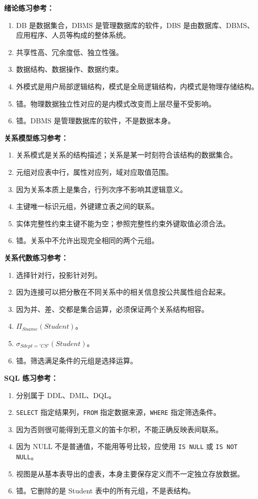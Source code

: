 \documentclass{../../note}
\begin{document}
\textbf{绪论练习参考：}

\begin{enumerate}
  \item DB 是数据集合，DBMS 是管理数据库的软件，DBS 是由数据库、DBMS、应用程序、人员等构成的整体系统。
  \item 共享性高、冗余度低、独立性强。
  \item 数据结构、数据操作、数据约束。
  \item 外模式是用户局部逻辑结构，模式是全局逻辑结构，内模式是物理存储结构。
  \item 错。物理数据独立性对应的是内模式改变而上层尽量不受影响。
  \item 错。DBMS 是管理数据库的软件，不是数据本身。
\end{enumerate}

\textbf{关系模型练习参考：}

\begin{enumerate}
  \item 关系模式是关系的结构描述；关系是某一时刻符合该结构的数据集合。
  \item 元组对应表中行，属性对应列，域对应取值范围。
  \item 因为关系本质上是集合，行列次序不影响其逻辑意义。
  \item 主键唯一标识元组，外键建立表之间的联系。
  \item 实体完整性约束主键不能为空；参照完整性约束外键取值必须合法。
  \item 错。关系中不允许出现完全相同的两个元组。
\end{enumerate}

\textbf{关系代数练习参考：}

\begin{enumerate}
  \item 选择针对行，投影针对列。
  \item 因为连接可以把分散在不同关系中的相关信息按公共属性组合起来。
  \item 因为并、差、交都是集合运算，必须保证两个关系结构相容。
  \item $\Pi_{Sname}(Student)$。
  \item $\sigma_{Sdept='CS'}(Student)$。
  \item 错。筛选满足条件的元组是选择运算。
\end{enumerate}

\textbf{SQL 练习参考：}

\begin{enumerate}
  \item 分别属于 DDL、DML、DQL。
  \item \texttt{SELECT} 指定结果列，\texttt{FROM} 指定数据来源，\texttt{WHERE} 指定筛选条件。
  \item 因为否则很可能得到无意义的笛卡尔积，不能正确反映表间联系。
  \item 因为 NULL 不是普通值，不能用等号比较，应使用 \texttt{IS NULL} 或 \texttt{IS NOT NULL}。
  \item 视图是从基本表导出的虚表，本身主要保存定义而不一定独立存放数据。
  \item 错。它删除的是 Student 表中的所有元组，不是表结构。
\end{enumerate}
\end{document}
